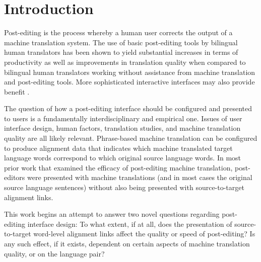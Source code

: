 
\section{Introduction}

Post-editing is the process whereby a human user corrects the output of a machine translation system.
%
The use of basic post-editing tools by bilingual human translators has been shown to yield substantial increases in terms of productivity \citep{2010_PBML_Plitt_Masselot} as well as improvements in translation quality \citep{2013_CHI_Green_etal} when compared to bilingual human translators working without assistance from machine translation and post-editing tools.
%
More sophisticated interactive interfaces \citep{2000_NAACL_Langlais_etal,2009_CL_Barrachina,2009_ACL_Koehn,2012_AMTA_Denkowski_Lavie} may also provide benefit \citep{2009_MT_Koehn}.







The question of how a post-editing interface should be configured and presented to users is a fundamentally interdisciplinary and empirical one.
%
Issues of user interface design, human factors, translation studies, and machine translation quality are all likely relevant.
%
Phrase-based machine translation can be configured to produce alignment data that indicates which machine translated target language words correspond to which original source language words.
%
In most prior work that examined the efficacy of post-editing machine translation, post-editors were presented with machine translations (and in most cases the original source language sentences) without also being presented with source-to-target alignment links.

This work begins an attempt to answer two novel questions regarding post-editing interface design: 
%
To what extent, if at all, does the presentation of source-to-target word-level alignment links affect the quality or speed of post-editing?
%
Is any such effect, if it exists, dependent on certain aspects of machine translation quality, or on the language pair?



